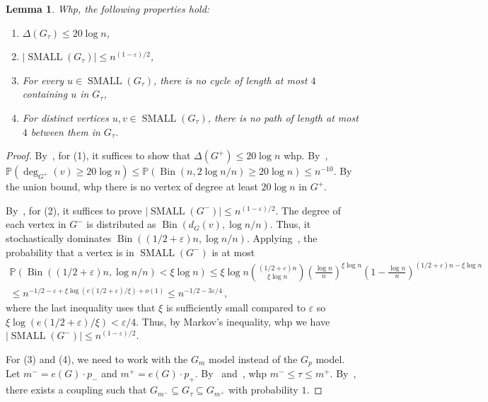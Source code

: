 \documentclass[reqno,final,a4paper]{amsart}
\numberwithin{equation}{section}
\newtheorem{lemma}[theorem]{Lemma}
\theoremstyle{definition}
\theoremstyle{remark}
\renewcommand{\Pr}{\mathbb{P}}
\newcommand{\eps}{\varepsilon}
\newcommand{\Bin}{\operatorname{Bin}}
\newcommand{\SMA}{\operatorname{SMALL}}
\begin{document}
\begin{lemma}\label{lem:small-property}
        Whp, the following properties hold:
        \begin{enumerate}
            \item $\Delta(G_\tau)\leq 20\log n$,
            \item $|\SMA(G_\tau)|\leq n^{(1-\eps)/2}$,
            \item For every $u\in \SMA(G_\tau)$, there is no cycle of length at most $4$ containing $u$ in $G_\tau$,
            \item For distinct vertices $u,v\in \SMA(G_\tau)$, there is no path of length at most $4$ between them in $G_\tau$.
        \end{enumerate}
    \end{lemma}
    \begin{proof}        
        By~, for (1), it suffices to show that $\Delta(G^+)\leq 20\log n$ whp. 
       By~, $\Pr(\deg_{G^+}(v)\geq 20\log n)\leq \Pr(\Bin(n, 2\log n/n)\geq 20\log n)\leq n^{-10}$. By the union bound, whp there is no vertex of degree at least $20\log n$ in $G^+$. 
        
        By~, for (2), it suffices to prove $|\SMA(G^-)|\leq n^{(1-\eps)/2}$.
        The degree of each vertex in $G^-$ is distributed as $\Bin(d_{G}(v), \log n/n)$. Thus, it stochastically dominates $\Bin((1/2+\eps)n, \log n/n)$. Applying~, the probability that a vertex is in $\SMA(G^-)$ is at most 
        \begin{multline*}
            \Pr(\Bin((1/2+\eps)n, \log n/n)<\xi \log n)\leq \xi\log n\binom{(1/2+\eps)n}{\xi \log n}\left(\frac{\log n}{n}\right)^{\xi\log n}\left(1-\frac{\log n}{n}\right)^{(1/2+\eps)n - \xi\log n}\\
            \leq n^{-1/2 - \eps + \xi\log(e(1/2+\eps)/\xi)+o(1)}\leq n^{-1/2-3\eps/4}\,,
        \end{multline*}
        where the last inequality uses that $\xi$ is sufficiently small compared to $\eps$ so $\xi \log(e(1/2+\eps)/\xi) < \eps/4$.
        Thus, by Markov's inequality, whp we have $|\SMA(G^-)|\leq n^{(1-\eps)/2}$.

    For (3) and (4), we need to work with the $G_m$ model instead of the $G_p$ model.
    Let $m^- = e(G)\cdot p_-$ and $m^+ = e(G) \cdot p_+$. 
    By~ and~, whp $m^-\leq \tau\leq m^+$.
    By~, there exists a coupling such that $G_{m^-}\subseteq G_\tau\subseteq G_{m^+}$ with probability $1$. 
    

\end{proof}
\end{document}
